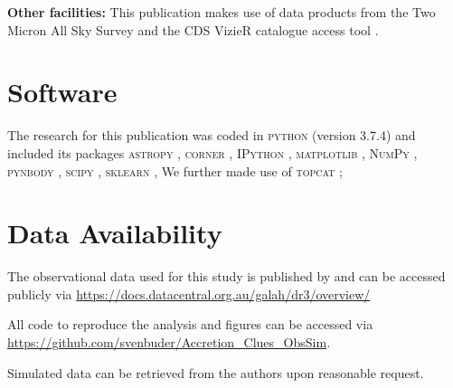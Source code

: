 \documentclass[fleqn,usenatbib]{mnras}
\begin{document}
\textbf{Other facilities:} This publication makes use of data products from the Two Micron All Sky Survey \citep{Skrutskie2006} and the CDS VizieR catalogue access tool \citep{Vizier2000}.

\section*{Software}

The research for this publication was coded in \textsc{python} (version 3.7.4) and included its packages
\textsc{astropy} \citep[v. 3.2.2;][]{Robitaille2013,PriceWhelan2018},
\textsc{corner} \citep[v. 2.0.1;][]{corner},
\textsc{IPython} \citep[v. 7.8.0;][]{ipython},
\textsc{matplotlib} \citep[v. 3.1.3;][]{matplotlib},
\textsc{NumPy} \citep[v. 1.17.2;][]{numpy},
\textsc{pynbody} \citep[v. 1.1.0;][]{pynbody},
\textsc{scipy} \citep[version 1.3.1;][]{scipy},
\textsc{sklearn} \citep[v. 0.21.3;][]{scikit-learn},
We further made use of \textsc{topcat} \citep[version 4.7;][]{Taylor2005};

\section*{Data Availability}

The observational data used for this study is published by \citet{Buder2021} and can be accessed publicly via \url{https://docs.datacentral.org.au/galah/dr3/overview/}

All code to reproduce the analysis and figures can be accessed via \url{https://github.com/svenbuder/Accretion_Clues_ObsSim}.

Simulated data can be retrieved from the authors upon reasonable request.







\bsp	%
\label{lastpage}
\end{document}
